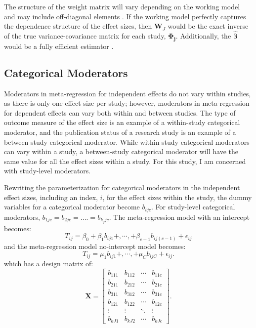 The structure of the weight matrix will vary depending on the working model and may include off-diagonal elements \autocite{pustejovsky2022}. If the working model perfectly captures the dependence structure of the effect sizes, then $ \mathbf{W}_J$ would be the exact inverse of the true variance-covariance matrix for each study, $\mathbf{\Phi_j}$. Additionally, the $\bm{\hat{\beta}}$ would be a fully efficient estimator \autocite{pustejovsky2022}.  

\subsection{Categorical Moderators} 

Moderators in meta-regression for independent effects do not vary within studies, as there is only one effect size per study; however, moderators in meta-regression for dependent effects can vary both within and between studies. The type of outcome measure of the effect size is an example of a within-study categorical moderator, and the publication status of a research study is an example of a between-study categorical moderator. While within-study categorical moderators can vary within a study, a between-study categorical moderator will have the same value for all the effect sizes within a study. For this study, I am concerned with study-level moderators. 

Rewriting the parameterization for categorical moderators in the independent effect sizes, including an index, $i$, for the effect sizes within the study, the dummy variables for a categorical moderator become $b_{ijc}$. For study-level categorical moderators, $b_{1jc} = b_{2jc} = .... = b_{k_j j c}$. The meta-regression model with an intercept becomes:
\begin{equation}
    T_{ij} = \beta_0 + \beta_1 b_{ij1} +, \cdots, +  \beta_{c-1}  b_{ij(c-1)} 
    +\epsilon_{ij}
\end{equation}
and the meta-regression model no-intercept model becomes:
\begin{equation} \label{eq: no-intercept dependent}
    T_{ij} = \mu_1 b_{ij1} +, \cdots, +   \mu_{C}  b_{ijC} 
    +\epsilon_{ij}.
\end{equation}
which has a design matrix of:
\begin{equation}
    \mathbf{X} = \begin{bmatrix}
     b_{111} & b_{112} &\cdots  & b_{11c} \\
     b_{211} & b_{212} &\cdots  & b_{21c} \\
     b_{311} & b_{312} &\cdots  & b_{31c} \\
     b_{121} & b_{122} & \cdots & b_{12c}\\
     \vdots & \vdots & \ddots & \vdots\\
     b_{kJ1} & b_{kJ2} & \cdots & b_{kJc}
    \end{bmatrix}.
    \nonumber
\end{equation}

